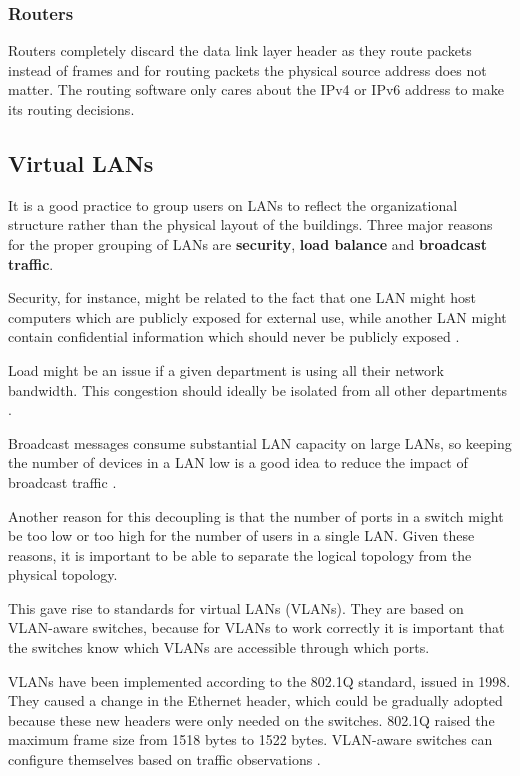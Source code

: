 \subsubsection{Routers}

Routers completely discard the data link layer header as they route packets instead of frames and for routing packets the physical source address does not matter.
The routing software only cares about the IPv4 or IPv6 address to make its routing decisions.

\subsection{Virtual LANs}

It is a good practice to group users on LANs to reflect the organizational structure rather than the physical layout of the buildings. Three major reasons for the proper grouping of LANs are \textbf{security}, \textbf{load balance} and \textbf{broadcast traffic}.

Security, for instance, might be related to the fact that one LAN might host computers which are publicly exposed for external use, while another LAN might contain confidential information which should never be publicly exposed  \cite[p.~343]{computer-networks-tanenbaum-2012}.

Load might be an issue if a given department is using all their network bandwidth. This congestion should ideally be isolated from all other departments \cite[p.~344]{computer-networks-tanenbaum-2012}.

Broadcast messages consume substantial LAN capacity on large LANs, so keeping the number of devices in a LAN low is a good idea to reduce the impact of broadcast traffic \cite[p.~344]{computer-networks-tanenbaum-2012}.

Another reason for this decoupling is that the number of ports in a switch might be too low or too high for the number of users in a single LAN.
Given these reasons, it is important to be able to separate the logical topology from the physical topology.

This gave rise to standards for virtual LANs (VLANs). They are based on VLAN-aware switches, because for VLANs to work correctly it is important that the switches know which VLANs are accessible through which ports.

VLANs have been implemented according to the 802.1Q standard, issued in 1998. They caused a change in the Ethernet header, which could be gradually adopted because these new headers were only needed on the switches. 802.1Q raised the maximum frame size from 1518 bytes to 1522 bytes. VLAN-aware switches can configure themselves based on traffic observations \cite[p.~348]{computer-networks-tanenbaum-2012}.

